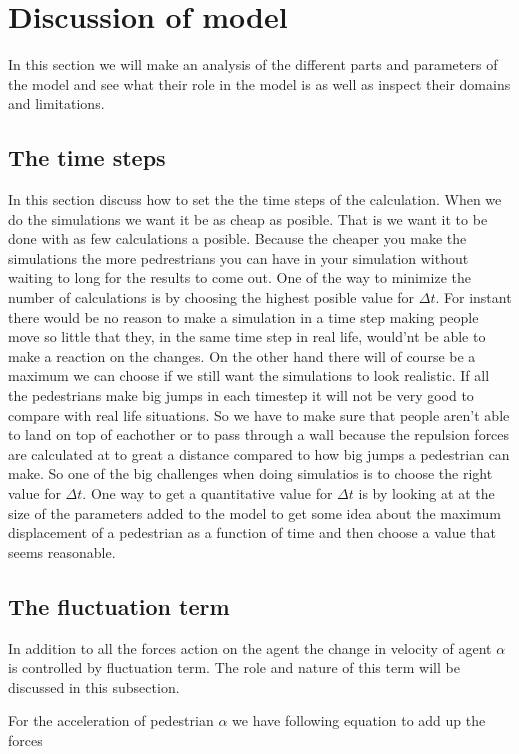 \section{Discussion of model}
In this section we will make an analysis of the different parts and 
parameters of the model and see what their role in the model is as well 
as inspect their domains and limitations. 

\subsection{The time steps}
In this section discuss how to set the the time steps of the calculation. 
When we do the simulations we want it be as cheap as posible. That is we want it to be done with as few calculations a posible. Because the cheaper you make the simulations the more pedrestrians you can have in your simulation without waiting to long for the results to come out. One of the way to minimize the number of calculations is by choosing the highest posible value for $\Delta t$. For instant there would be no reason to make a simulation in a time step making people move so little that they, in the same time step in real life, would'nt be able to make a reaction on the changes.  
On the other hand there will of course be a maximum we can choose if we still want the simulations to look realistic. If all the pedestrians make big jumps in each timestep it will not be very good to compare with real life situations. So we have to make sure that people aren't able to land on top of eachother or to pass through a wall because the repulsion forces are calculated at to great a distance compared to how big jumps a pedestrian can make.
So one of the big challenges when doing simulatios is to choose the right value for $\Delta t$. One way to get a quantitative value for $\Delta t$ is by looking at at the size of the parameters added to the model to get some idea about the maximum displacement of a pedestrian as a function of time and then choose a value that seems reasonable.


\subsection{The fluctuation term}
In addition to all the forces action on the agent the change in velocity of agent 
$\alpha$ is controlled by fluctuation term. The role and nature of this term will 
be discussed in this subsection.

For the acceleration of pedestrian $\alpha$ we have following equation to add up the forces


